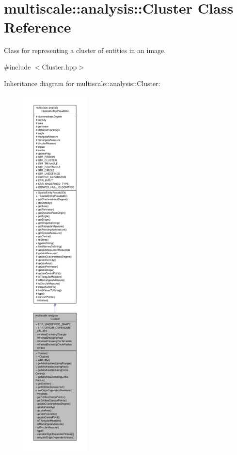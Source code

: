 \hypertarget{classmultiscale_1_1analysis_1_1Cluster}{\section{multiscale\-:\-:analysis\-:\-:Cluster Class Reference}
\label{classmultiscale_1_1analysis_1_1Cluster}
}


Class for representing a cluster of entities in an image.  




{\ttfamily \#include $<$Cluster.\-hpp$>$}



Inheritance diagram for multiscale\-:\-:analysis\-:\-:Cluster\-:
\nopagebreak
\begin{figure}[H]
\begin{center}
\leavevmode
\includegraphics[height=550pt]{classmultiscale_1_1analysis_1_1Cluster__inherit__graph}
\end{center}
\end{figure}


